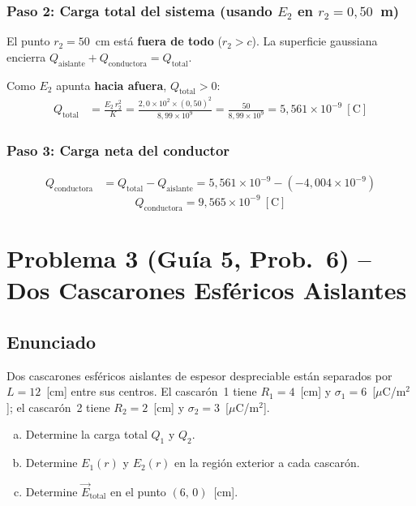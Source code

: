 \documentclass[12pt,letterpaper]{article}
\begin{document}
\subsubsection*{Paso 2: Carga total del sistema (usando $E_2$ en $r_2 = 0{,}50$~m)}

El punto $r_2 = 50$~cm est\'a \textbf{fuera de todo} ($r_2 > c$). La superficie gaussiana
encierra $Q_\text{aislante} + Q_\text{conductora} = Q_\text{total}$.

Como $E_2$ apunta \textbf{hacia afuera}, $Q_\text{total} > 0$:
\begin{align*}
    Q_\text{total} &= \frac{E_2\,r_2^2}{K}
    = \frac{2{,}0\times10^2 \times (0{,}50)^2}{8{,}99\times10^9}
    = \frac{50}{8{,}99\times10^9}
    = 5{,}561\times10^{-9}\ [\text{C}]
\end{align*}

\subsubsection*{Paso 3: Carga neta del conductor}

\begin{align*}
    Q_\text{conductora} &= Q_\text{total} - Q_\text{aislante}
    = 5{,}561\times10^{-9} - (-4{,}004\times10^{-9})
\end{align*}
\[
    \boxed{Q_\text{conductora} = 9{,}565\times10^{-9}\ [\text{C}]}
\]

\newpage
\section*{Problema 3 \textnormal{(Gu\'ia 5, Prob.\ 6)} -- Dos Cascarones Esf\'ericos Aislantes}

\subsection*{Enunciado}

Dos cascarones esf\'ericos aislantes de espesor despreciable est\'an separados por $L = 12$~[cm]
entre sus centros. El cascar\'on~1 tiene $R_1 = 4$~[cm] y $\sigma_1 = 6$~[$\mu$C/m$^2$];
el cascar\'on~2 tiene $R_2 = 2$~[cm] y $\sigma_2 = 3$~[$\mu$C/m$^2$].
\begin{enumerate}[(a)]
    \item Determine la carga total $Q_1$ y $Q_2$.
    \item Determine $E_1(r)$ y $E_2(r)$ en la regi\'on exterior a cada cascar\'on.
    \item Determine $\vec{E}_\text{total}$ en el punto $(6,\,0)$~[cm].
\end{enumerate}
\end{document}
